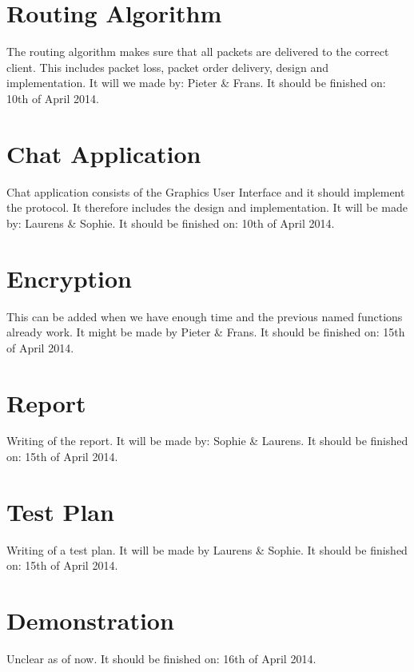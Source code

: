 \documentclass{article}
\begin{document}
    \section{Routing Algorithm}
    The routing algorithm makes sure that all packets are delivered to the correct client. This includes packet loss, packet order delivery, design and implementation.
    It will we made by: Pieter \& Frans.
    It should be finished on: 10th of April 2014.

    \section{Chat Application}
    Chat application consists of the Graphics User Interface and it should implement the protocol. It therefore includes the design and implementation.
    It will be made by: Laurens \& Sophie.
    It should be finished on: 10th of April 2014.

    \section{Encryption}
    This can be added when we have enough time and the previous named functions already work.
    It might be made by Pieter \& Frans.
    It should be finished on: 15th of April 2014.

    \section{Report}
    Writing of the report.
    It will be made by: Sophie \& Laurens.
    It should be finished on: 15th of April 2014.

    \section{Test Plan}
    Writing of a test plan.
    It will be made by Laurens \& Sophie.
    It should be finished on: 15th of April 2014.

    \section{Demonstration}
    Unclear as of now.
    It should be finished on: 16th of April 2014.
\end{document}
